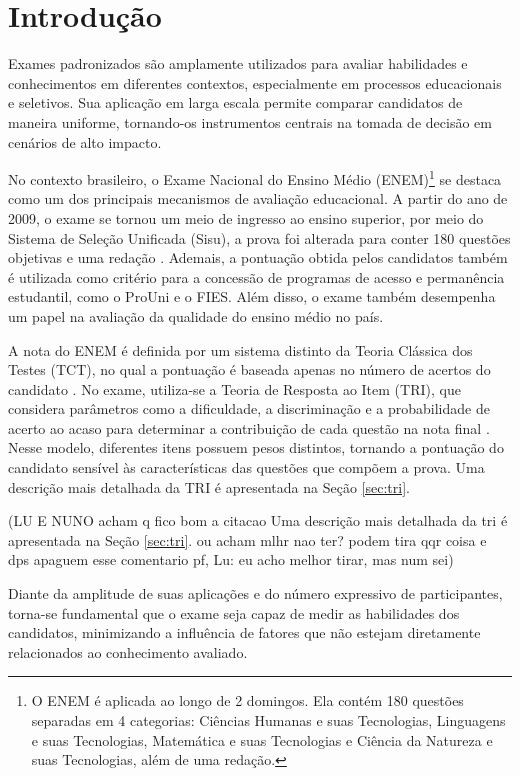\documentclass[a4paper,10pt, twocolumn]{article}
\begin{document}
\section{Introdução}

Exames padronizados são amplamente utilizados para avaliar habilidades e conhecimentos em diferentes contextos, especialmente em processos educacionais e seletivos. Sua aplicação em larga escala permite comparar candidatos de maneira uniforme, tornando-os instrumentos centrais na tomada de decisão em cenários de alto impacto.

No contexto brasileiro, o Exame Nacional do Ensino Médio (ENEM)\footnote{O ENEM é aplicada ao longo de 2 domingos. Ela contém 180 questões separadas em 4 categorias: Ciências Humanas e suas Tecnologias, Linguagens e suas Tecnologias, Matemática e suas Tecnologias e Ciência da Natureza e suas Tecnologias, além de uma redação.} se destaca como um dos principais mecanismos de avaliação educacional. A partir do ano de 2009, o exame se tornou um meio de ingresso ao ensino superior, por meio do Sistema de Seleção Unificada (Sisu), a prova foi alterada para conter 180 questões objetivas e uma redação \cite{Inep_2020}. Ademais, a pontuação obtida pelos candidatos também é utilizada como critério para a concessão de programas de acesso e permanência estudantil, como o ProUni e o FIES. Além disso, o exame também desempenha um papel na avaliação da qualidade do ensino médio no país.

A nota do ENEM é definida por um sistema distinto da Teoria Clássica dos Testes (TCT), no qual a pontuação é baseada apenas no número de acertos do candidato \cite{sousa_teoria_2020}. No exame, utiliza-se a Teoria de Resposta ao Item (TRI), que considera parâmetros como a dificuldade, a discriminação e a probabilidade de acerto ao acaso para determinar a contribuição de cada questão na nota final \cite{inep2021enem}. Nesse modelo, diferentes itens possuem pesos distintos, tornando a pontuação do candidato sensível às características das questões que compõem a prova. Uma descrição mais detalhada da TRI é apresentada na Seção \ref{sec:tri}.

(LU E NUNO acham q fico bom a citacao  Uma descrição mais detalhada da tri é apresentada na Seção \ref{sec:tri}. ou acham mlhr nao ter? podem tira qqr coisa e dps apaguem esse comentario pf, Lu: eu acho melhor tirar, mas num sei)

Diante da amplitude de suas aplicações e do número expressivo de participantes, torna-se fundamental que o exame seja capaz de medir as habilidades dos candidatos, minimizando a influência de fatores que não estejam diretamente relacionados ao conhecimento avaliado.
\end{document}
